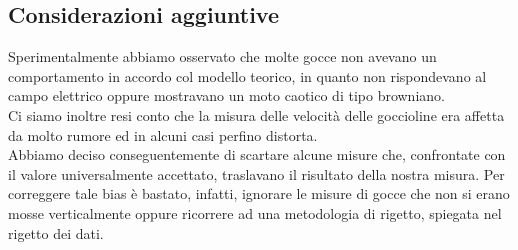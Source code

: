     \subsection{Considerazioni aggiuntive}
        Sperimentalmente abbiamo osservato che molte gocce non avevano un comportamento in accordo col modello teorico, in quanto non rispondevano al campo elettrico oppure mostravano un moto caotico di tipo browniano.\\
        Ci siamo inoltre resi conto che la misura delle velocità delle goccioline era affetta da molto rumore ed in alcuni casi perfino distorta.\\
        Abbiamo deciso conseguentemente di scartare alcune misure che, confrontate con il valore universalmente accettato, traslavano il risultato della nostra misura. Per correggere tale bias è bastato, infatti, ignorare le misure di gocce che non si erano mosse verticalmente oppure ricorrere ad una metodologia di rigetto, spiegata nel rigetto dei dati.
